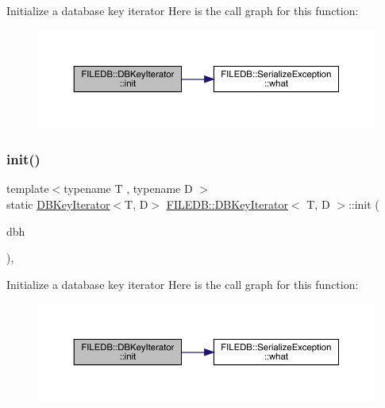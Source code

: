 Initialize a database key iterator Here is the call graph for this function\+:
\nopagebreak
\begin{figure}[H]
\begin{center}
\leavevmode
\includegraphics[width=350pt]{d4/d89/classFILEDB_1_1DBKeyIterator_af4a5e1eaeb6e5c491c5894f3e70f893c_cgraph}
\end{center}
\end{figure}
\mbox{\label{classFILEDB_1_1DBKeyIterator_af4a5e1eaeb6e5c491c5894f3e70f893c}} 
\subsubsection{\texorpdfstring{init()}{init()}\hspace{0.1cm}{\footnotesize\ttfamily [2/2]}}
{\footnotesize\ttfamily template$<$typename T , typename D $>$ \\
static \mbox{\hyperlink{classFILEDB_1_1DBKeyIterator}{D\+B\+Key\+Iterator}}$<$T, D$>$ \mbox{\hyperlink{classFILEDB_1_1DBKeyIterator}{F\+I\+L\+E\+D\+B\+::\+D\+B\+Key\+Iterator}}$<$ T, D $>$\+::init (\begin{DoxyParamCaption}\item[{\mbox{\hyperlink{other__libs_2filedb_2filehash_2ffdb__db_8h_a0b27b956926453a7a8141ea8e10f0df8}{F\+F\+D\+B\+\_\+\+DB}} $\ast$}]{dbh }\end{DoxyParamCaption})\hspace{0.3cm}{\ttfamily [inline]}, {\ttfamily [static]}}

Initialize a database key iterator Here is the call graph for this function\+:
\nopagebreak
\begin{figure}[H]
\begin{center}
\leavevmode
\includegraphics[width=350pt]{d4/d89/classFILEDB_1_1DBKeyIterator_af4a5e1eaeb6e5c491c5894f3e70f893c_cgraph}
\end{center}
\end{figure}
\mbox{\label{classFILEDB_1_1DBKeyIterator_aa92d51bde395e8c546d9cbe1c65ef5e1}} 
